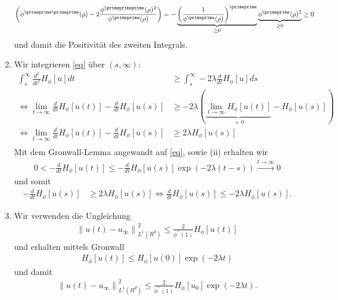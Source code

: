 \begin{solution}
\begin{enumerate}[label = (\roman*)]
\begin{align*}
  \left(\phi^{\primeprime\primeprime}(\rho) -
  2\frac{\phi^{\primeprimeprime}(\rho)^2}{\phi^{\primeprime}(\rho)}\right) =
  -\underbrace{\left(\frac{1}{\phi^{\primeprime}(\rho)}\right)^{\primeprime}}
  _{\geq 0}\underbrace{\phi^{\primeprime}(\rho)^2}_{\geq 0} \geq 0
  \end{align*}
  und damit die Positivität des zweiten Integrals.
  \item Wir integrieren \eqref{eq} über $(s,\infty)$:
  \begin{align*}
    \int_s^{\infty}  \frac{d^{2}}{d t^{2}} H_{\phi}[u] dt &\geq
    \int_s^{\infty} -2 \lambda \frac{d}{d t} H_{\phi}[u] ds \\
    \iff \lim_{t \to \infty} \frac{d}{d t} H_{\phi}[u(t)] -\frac{d}{d t} H_{\phi}[u(s)]
    &\geq -2\lambda(\underbrace{\lim_{t \to \infty} H_{\phi}[u(t)]}_{=0} - H_{\phi}[u(s)]) \\
    \iff \lim_{t \to \infty} \frac{d}{d t} H_{\phi}[u(t)] -\frac{d}{d t} H_{\phi}[u(s)]
    &\geq 2\lambda H_{\phi}[u(s)] \\
  \end{align*}
  Mit dem Gronwall-Lemma angewandt auf \eqref{eq}, sowie (ii) erhalten wir
  \begin{align*}
    0 < -\frac{d}{d t} H_{\phi}[u(t)] \leq -\frac{d}{d t} H_{\phi}[u(s)]\exp(-2\lambda (t-s))
    \xrightarrow{t \to \infty} 0
  \end{align*}
  und somit
  \begin{align*}
  -\frac{d}{d t} H_{\phi}[u(s)]
  &\geq 2\lambda H_{\phi}[u(s)] \iff \frac{d}{d t} H_{\phi}[u(s)] \leq -2\lambda H_{\phi}[u(s)].
  \end{align*}
  \item Wir verwenden die Ungleichung
  \begin{align*}
  \left\|u(t)-u_{\infty}\right\|_{L^{1}\left(R^{d}\right)}^2
  \leq \frac{2}{\phi^{\prime \prime}(1)} H_{\phi}[u(t)]
  \end{align*}
  und erhalten mittels Gronwall
  \begin{align*}
    H_{\phi}[u(t)] \leq H_{\phi}[u(0)]\exp(-2\lambda t)
  \end{align*}
  und damit
  \begin{align*}
  \left\|u(t)-u_{\infty}\right\|_{L^{1}\left(R^{d}\right)}^2
  \leq \frac{2}{\phi^{\prime \prime}(1)} H_{\phi}[u_0]\exp(-2\lambda t).
  \end{align*}
\end{enumerate}

\end{solution}

